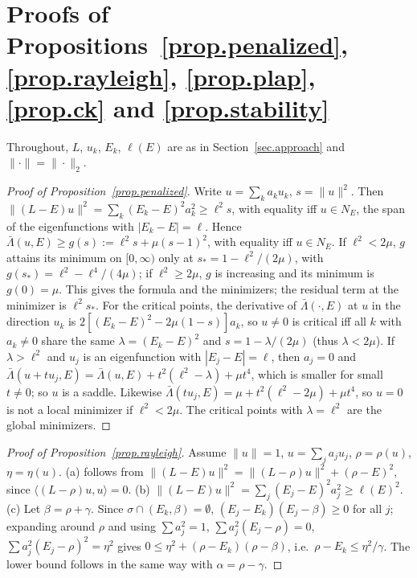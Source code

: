 \documentclass[10pt]{amsart}
\newenvironment{revblock}{\color{blue}}{}
\theoremstyle{definition}
\theoremstyle{remark}
\theoremstyle{plain}
\begin{document}
\section{Proofs of Propositions~\ref{prop.penalized}, \ref{prop.rayleigh}, \ref{prop.plap}, \ref{prop.ck} and \ref{prop.stability}}\label{app.proofs}
\begin{revblock}
Throughout, $L$, $u_k$, $E_k$, $\ell(E)$ are as in Section~\ref{sec.approach} and $\|\cdot\|=\|\cdot\|_2$.

\begin{proof}[Proof of Proposition~\ref{prop.penalized}]
Write $u=\sum_ka_ku_k$, $s=\|u\|^2$. Then $\|(L-E)u\|^2=\sum_k(E_k-E)^2a_k^2\ge \ell^2s$, with equality
iff $u\in N_E$, the span of the eigenfunctions with $|E_k-E|=\ell$. Hence
$\bar\Lambda(u,E)\ge g(s):=\ell^2s+\mu(s-1)^2$, with equality iff $u\in N_E$. If $\ell^2<2\mu$, $g$ attains its
minimum on $[0,\infty)$ only at $s_*=1-\ell^2/(2\mu)$, with $g(s_*)=\ell^2-\ell^4/(4\mu)$; if $\ell^2\ge2\mu$, $g$ is
increasing and its minimum is $g(0)=\mu$. This gives the formula and the minimizers; the residual term
at the minimizer is $\ell^2s_*$. For the critical points, the derivative of $\bar\Lambda(\cdot,E)$ at $u$ in
the direction $u_k$ is $2[(E_k-E)^2-2\mu(1-s)]a_k$, so $u\ne0$ is critical iff all $k$ with
$a_k\ne0$ share the same $\lambda=(E_k-E)^2$ and $s=1-\lambda/(2\mu)$ (thus $\lambda<2\mu$). If
$\lambda>\ell^2$ and $u_j$ is an eigenfunction with $|E_j-E|=\ell$, then $a_j=0$ and
$\bar\Lambda(u+tu_j,E)=\bar\Lambda(u,E)+t^2(\ell^2-\lambda)+\mu t^4$, which is smaller for small $t\ne0$; so
$u$ is a saddle. Likewise $\bar\Lambda(tu_j,E)=\mu+t^2(\ell^2-2\mu)+\mu t^4$, so $u=0$ is not a local
minimizer if $\ell^2<2\mu$. The critical points with $\lambda=\ell^2$ are the global minimizers.
\end{proof}

\begin{proof}[Proof of Proposition~\ref{prop.rayleigh}]
Assume $\|u\|=1$, $u=\sum_ja_ju_j$, $\rho=\rho(u)$, $\eta=\eta(u)$. (a) follows from
$\|(L-E)u\|^2=\|(L-\rho)u\|^2+(\rho-E)^2$, since $\langle(L-\rho)u,u\rangle=0$. (b) $\|(L-E)u\|^2=
\sum_j(E_j-E)^2a_j^2\ge \ell(E)^2$. (c) Let $\beta=\rho+\gamma$. Since $\sigma\cap(E_k,\beta)=\emptyset$,
$(E_j-E_k)(E_j-\beta)\ge0$ for all $j$; expanding around $\rho$ and using $\sum a_j^2=1$,
$\sum a_j^2(E_j-\rho)=0$, $\sum a_j^2(E_j-\rho)^2=\eta^2$ gives $0\le\eta^2+(\rho-E_k)(\rho-\beta)$, i.e.\
$\rho-E_k\le\eta^2/\gamma$. The lower bound follows in the same way with $\alpha=\rho-\gamma$.
\end{proof}


\end{revblock}
\end{document}
